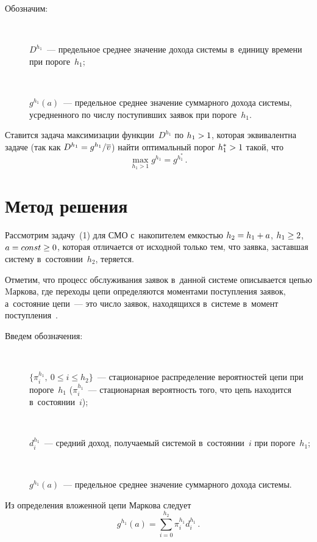 \begin{multicols}{2}
  Обозначим:
  \begin{description}
  \item[\,] $D^{h_1}$~--- предельное среднее значение дохода сис\-те\-мы 
в~единицу времени при пороге~$h_1$;
  \item[\,] $g^{h_1}(a)$~--- предельное среднее значение суммарного дохода  
сис\-те\-мы, усредненного по чис\-лу поступивших заявок при пороге~$h_1$.
  \end{description}
  
  Ставится задача максимизации функции~$D^{h_1}$ по $h_1\hm>1$, которая 
эквивалентна задаче (так как $D^{h_1}\hm= g^{h_1}/\overline{v}$) найти 
оптимальный порог $h_1^*\hm> 1$ такой, что
  \begin{equation}
  \max\limits_{h_1>1} g^{h_1}=g^{h_1^*}\,.
  \label{e1-aga}
  \end{equation}
  
\section{Метод решения}

\vspace*{2pt}

  Рассмотрим задачу~(1) для СМО с~накопителем емкостью $h_2\hm= h_1\hm+ 
a$, $h_1\hm\geq 2$, $a\hm= const \hm\geq 0$, которая отличается от исходной 
только тем, что заявка, заставшая сис\-те\-му в~состоянии~$h_2$, теряется. 
  
  Отметим, что процесс обслуживания заявок в~данной сис\-те\-ме описывается 
цепью Mаркова, где переходы цепи определяются моментами поступления 
заявок, а~со\-сто\-яние цепи~--- это чис\-ло заявок, находящихся в~сис\-те\-ме 
в~момент поступления~\cite{9-aga}. 
  
  Введем обозначения:
  \begin{description}
  \item[\,] $\{\pi_i^{h_1},\ 0\leq i\leq h_2\}$~--- стационарное распределение 
вероятностей цепи при пороге~$h_1$ ($\pi_i^{h_1}$~--- стационарная 
вероятность того, что цепь находится в~со\-сто\-я\-нии~$i$);
  \item[\,] $d_i^{h_1}$~---  средний доход, получаемый сис\-те\-мой  
в~со\-сто\-я\-нии~$i$ при пороге~$h_1$;
  \item[\,] $g^{h_1}(a)$~--- предельное среднее значение суммарного дохода  
сис\-темы.
\end{description}

Из определения вложенной цепи Маркова следует
\begin{equation}
g^{h_1}(a)= \sum\limits_{i=0}^{h_2} \pi_i^{h_1} d_i^{h_1}\,.
\label{e2-aga}
\end{equation}
  

\end{multicols}
